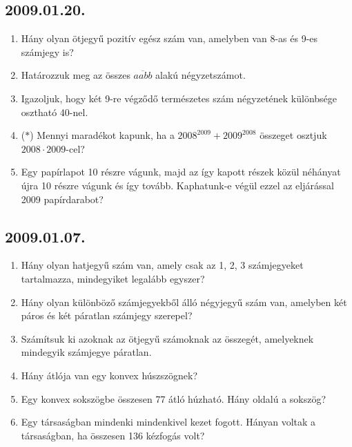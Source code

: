 \documentclass{article}
\begin{document}
\subsection*{2009.01.20.}
\begin{enumerate}
\item Hány olyan ötjegyű pozitív egész szám van, amelyben van 8-as és 9-es számjegy is? 
\item Határozzuk meg az összes $\overline{aabb}$ alakú négyzetszámot.
\item Igazoljuk, hogy két 9-re végződő természetes szám négyzetének különbsége osztható 40-nel.
\item ($*$) Mennyi maradékot kapunk, ha a $2008^{2009}+2009^{2008}$ összeget
osztjuk $2008\cdot 2009$-cel?
\item Egy papírlapot 10 részre vágunk, majd az így kapott részek közül néhányat újra 10 részre vágunk és így tovább. Kaphatunk-e végül ezzel az eljárással 2009 
papírdarabot?
\end{enumerate}

\subsection*{2009.01.07.}
\begin{enumerate}
\item Hány olyan hatjegyű szám van, amely csak az 1, 2, 3 számjegyeket tartalmazza,
mindegyiket legalább egyszer?
\item Hány olyan különböző számjegyekből álló négyjegyű szám van, amelyben két páros és két páratlan számjegy szerepel?
\item Számítsuk ki azoknak az ötjegyű számoknak az összegét, amelyeknek mindegyik számjegye páratlan.
\item Hány átlója van egy konvex húszszögnek?
\item Egy konvex sokszögbe összesen 77 átló húzható. Hány oldalú a sokszög?
\item Egy társaságban mindenki mindenkivel kezet fogott. Hányan voltak a társaságban, ha összesen 136 kézfogás volt?
\end{enumerate}
\end{document}
